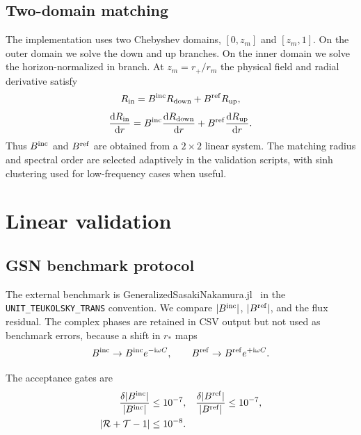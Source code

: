 \documentclass[aps,prd,twocolumn,nofootinbib,superscriptaddress,10pt]{revtex4-2}
\newcommand{\ii}{\mathrm{i}}
\newcommand{\dd}{\mathrm{d}}
\newcommand{\rp}{r_+}
\newcommand{\Bin}{B^{\rm inc}}
\newcommand{\Bref}{B^{\rm ref}}
\begin{document}
\subsection{Two-domain matching}

The implementation uses two Chebyshev domains, $[0,z_m]$ and $[z_m,1]$.
On the outer domain we solve the down and up branches.  On the inner domain we
solve the horizon-normalized in branch.  At $z_m=\rp/r_m$ the physical field
and radial derivative satisfy
\begin{equation}
R_{\rm in}= \Bin R_{\rm down}+\Bref R_{\rm up},
\end{equation}
\begin{equation}
\frac{\dd R_{\rm in}}{\dd r}=
\Bin \frac{\dd R_{\rm down}}{\dd r}
+\Bref \frac{\dd R_{\rm up}}{\dd r}.
\end{equation}
Thus $\Bin$ and $\Bref$ are obtained from a $2\times2$ linear system.  The
matching radius and spectral order are selected adaptively in the validation
scripts, with sinh clustering used for low-frequency cases when useful.

\section{Linear validation}
\label{sec:validation}

\subsection{GSN benchmark protocol}

The external benchmark is GeneralizedSasakiNakamura.jl~\cite{GSN} in the
\texttt{UNIT\_TEUKOLSKY\_TRANS} convention.  We compare
$|\Bin|$, $|\Bref|$, and the flux residual.  The complex phases are retained in
CSV output but not used as benchmark errors, because a shift in $r_*$ maps
\begin{equation}
\Bin\rightarrow \Bin e^{-\ii\omega C},\qquad
\Bref\rightarrow \Bref e^{+\ii\omega C}.
\end{equation}

The acceptance gates are
\begin{align}
\frac{\delta|\Bin|}{|\Bin|}&\leq 10^{-7},&
\frac{\delta|\Bref|}{|\Bref|}&\leq 10^{-7},\notag\\
|\mathcal R+\mathcal T-1|&\leq 10^{-8}.
\end{align}
\end{document}
